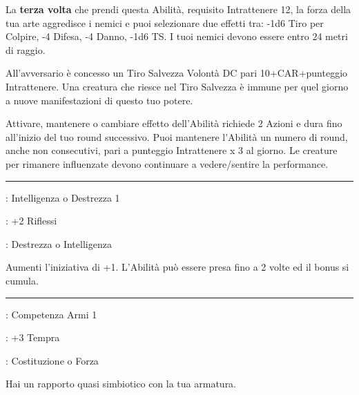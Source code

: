 \begin{multicols}{2}
La \textbf{terza volta} che prendi questa Abilità, requisito Intrattenere 12, la forza della tua arte aggredisce i nemici e puoi selezionare due effetti tra: -1d6 Tiro per Colpire, -4 Difesa, -4 Danno, -1d6 TS. I tuoi nemici devono essere entro 24 metri di raggio.

All'avversario è concesso un Tiro Salvezza Volontà DC pari 10+CAR+punteggio Intrattenere. Una creatura che riesce nel Tiro Salvezza è immune per quel giorno a nuove manifestazioni di questo tuo potere.

Attivare, mantenere o cambiare effetto dell'Abilità richiede 2 Azioni e dura fino all'inizio del tuo round successivo. Puoi mantenere l'Abilità un numero di round, anche non consecutivi, pari a punteggio Intrattenere x 3 al giorno. Le creature per rimanere influenzate devono continuare a vedere/sentire la performance.

\smallskip\noindent\rule{\linewidth}{2pt} \hypertarget{Iniziativa migliorata}{}\medskip{}
\noindent
\begin{description}[noitemsep, topsep=0pt, parsep=0pt, partopsep=0pt, leftmargin=0cm, labelwidth=2.5cm]
    \item[\textbf{Requisito}]: Intelligenza o Destrezza 1
    \item[\textbf{Tiri Salvezza}]: +2 Riflessi
    \item[\textbf{Caratteristica}]: Destrezza o Intelligenza
\end{description}

Aumenti l'iniziativa di +1. L'Abilità può essere presa fino a 2 volte ed il bonus si cumula.

\smallskip\noindent\rule{\linewidth}{2pt} \hypertarget{La mia pelle}{}\medskip{}
\noindent
\begin{description}[noitemsep, topsep=0pt, parsep=0pt, partopsep=0pt, leftmargin=0cm, labelwidth=2.5cm]
    \item[\textbf{Requisito}]: Competenza Armi 1
    \item[\textbf{Tiri Salvezza}]: +3 Tempra
    \item[\textbf{Caratteristica}]: Costituzione o Forza
\end{description}

Hai un rapporto quasi simbiotico con la tua armatura.


\end{multicols}
